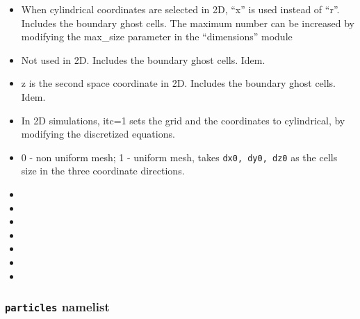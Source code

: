 \begin{itemize}
\item
{}
{When cylindrical coordinates are selected in 2D, ``x'' is used instead 
 of ``r''. Includes the boundary ghost cells. The maximum number can be 
 increased by modifying the max\_size parameter in the ``dimensions'' module}

\item
{}
{Not used in 2D. Includes the boundary ghost cells. Idem.}

\item
{}
{z is the second space coordinate in 2D. Includes the boundary ghost cells.
Idem. }

\item
{}
{In 2D simulations, itc=1 sets the grid and the coordinates to cylindrical,
by modifying the discretized equations.}

\item
{}
{0 - non uniform mesh; 1 - uniform mesh, takes {\tt dx0, dy0, dz0} as the
cells size in the three coordinate directions.}

\item
{}
{}

\item
{}
{}

\item
{}
{}

\item
{}
{}

\item
{}
{}

\item
{}
{}

\item
{}
{}

\end{itemize}

\subsubsection{{\tt particles} namelist}

